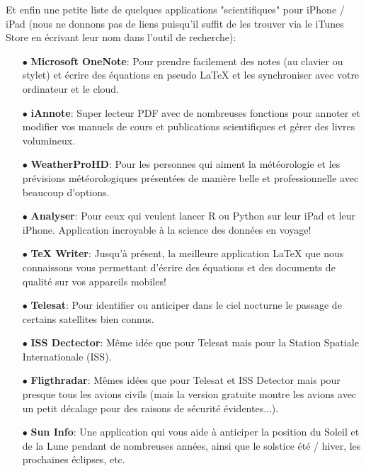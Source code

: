 	Et enfin une petite liste de quelques applications "scientifiques" pour iPhone / iPad (nous ne donnons pas de liens puisqu'il suffit de les trouver via le iTunes Store en écrivant leur nom dans l'outil de recherche):
	\begin{itemize}
		\item[$\bullet$] \textbf{Microsoft OneNote}: Pour prendre facilement des notes (au clavier ou stylet) et écrire des équations en pseudo LaTeX et les synchroniser avec votre ordinateur et le cloud.
		
		\item[$\bullet$] \textbf{iAnnote}: Super lecteur PDF avec de nombreuses fonctions pour annoter et modifier vos manuels de cours et publications scientifiques et gérer des livres volumineux.
		
		\item[$\bullet$] \textbf{WeatherProHD}: Pour les personnes qui aiment la météorologie et les prévisions météorologiques présentées de manière belle et professionnelle avec beaucoup d'options.
		
		\item[$\bullet$] \textbf{Analyser}: Pour ceux qui veulent lancer R ou Python sur leur iPad et leur iPhone. Application incroyable à la science des données en voyage!
		
		\item[$\bullet$] \textbf{TeX Writer}: Jusqu'à présent, la meilleure application \LaTeX{} que nous connaissons vous permettant d'écrire des équations et des documents de qualité sur vos appareils mobiles!
		
		\item[$\bullet$] \textbf{Telesat}: Pour identifier ou anticiper dans le ciel nocturne le passage de certains satellites bien connus.
		
		\item[$\bullet$] \textbf{ISS Dectector}: Même idée que pour Telesat mais pour la Station Spatiale Internationale (ISS).
		
		\item[$\bullet$] \textbf{Fligthradar}: Mêmes idées que pour Telesat et ISS Detector mais pour presque tous les avions civils (mais la version gratuite montre les avions avec un petit décalage pour des raisons de sécurité évidentes...).
		
		\item[$\bullet$]  \textbf{Sun Info}: Une application qui vous aide à anticiper la position du Soleil et de la Lune pendant de nombreuses années, ainsi que le solstice été / hiver, les prochaines éclipses, etc.
		

\end{itemize}
